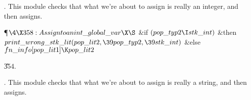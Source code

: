 .
This module checks that what we're about to assign is really an
integer, and then assigns.

\Y\P$\4\X358:Assign to an \\{int\_global\_var}\X\S$\6
\&{if} $(\\{pop\_typ2}\I\\{stk\_int})$ \1\&{then}\5
$\\{print\_wrong\_stk\_lit}(\\{pop\_lit2},\39\\{pop\_typ2},\39\\{stk\_int})$\6
\4\&{else} $\\{fn\_info}[\\{pop\_lit1}]\K\\{pop\_lit2}$\2\par
\U354.\fi

.
This module checks that what we're about to assign is really a
string, and then assigns.

